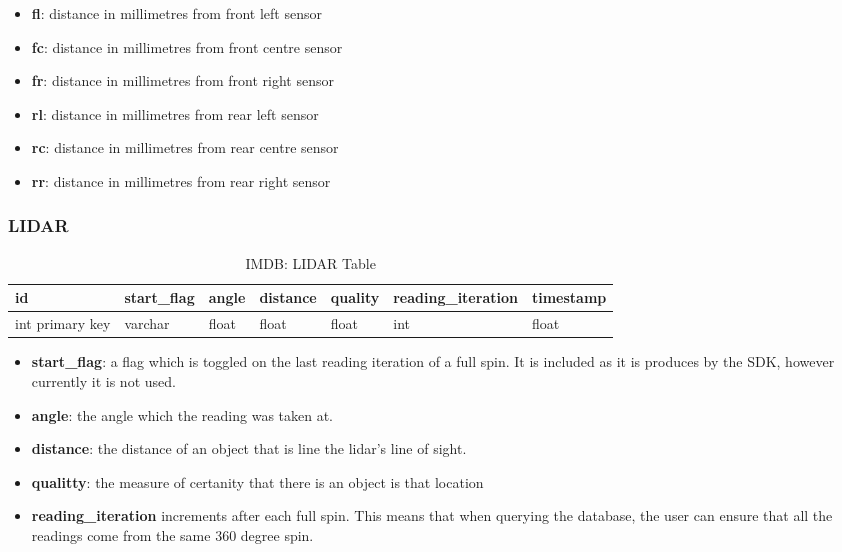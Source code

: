 \begin{itemize}
\item{\textbf{fl}}: distance in millimetres from front left sensor
\item{\textbf{fc}}: distance in millimetres from  front centre sensor
\item{\textbf{fr}}: distance in millimetres from  front right sensor
\item{\textbf{rl}}: distance in millimetres from rear left sensor
\item{\textbf{rc}}: distance in millimetres from rear centre sensor
\item{\textbf{rr}}: distance in millimetres from rear right sensor
\end{itemize}

\subsubsection{LIDAR}
\begin{table}[!htb]
\centering
\begin{tabular}{|l|l|l|l|l|l|l|}
\hline
id              & start\_flag & angle & distance & quality & reading\_iteration & timestamp \\ \hline
int primary key & varchar     & float & float    & float   & int            & float\\ \hline
\end{tabular}
\caption{IMDB: LIDAR Table}
\label{tab:db-lidar}
\end{table}
\begin{itemize}
\item{\textbf{start\_flag}}: a flag which is toggled on the last reading iteration of a full spin. It is included as it is produces by the SDK, however currently it is not used.
\item{\textbf{angle}}: the angle which the reading was taken at.
\item{\textbf{distance}}: the distance of an object that is line the lidar's line of sight.
\item{\textbf{qualitty}}: the measure of certanity that there is an object is that location
\item{\textbf{reading\_iteration}} increments after each full spin. This means that when querying the database, the user can ensure that all the readings come from the same 360 degree spin.
\end{itemize}


